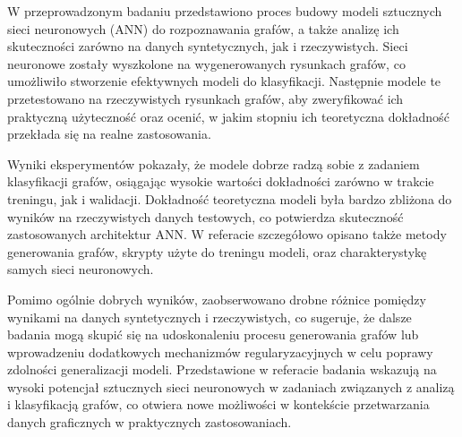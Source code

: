 
W przeprowadzonym badaniu przedstawiono proces budowy modeli sztucznych sieci neuronowych (ANN) do rozpoznawania grafów,
a także analizę ich skuteczności zarówno na danych syntetycznych, jak i rzeczywistych.
Sieci neuronowe zostały wyszkolone na wygenerowanych rysunkach grafów,
co umożliwiło stworzenie efektywnych modeli do klasyfikacji.
Następnie modele te przetestowano na rzeczywistych rysunkach grafów,
aby zweryfikować ich praktyczną użyteczność oraz ocenić,
w jakim stopniu ich teoretyczna dokładność przekłada się na realne zastosowania.

Wyniki eksperymentów pokazały, że modele dobrze radzą sobie z zadaniem klasyfikacji grafów,
osiągając wysokie wartości dokładności zarówno w trakcie treningu, jak i walidacji.
Dokładność teoretyczna modeli była bardzo zbliżona do wyników na rzeczywistych danych testowych,
co potwierdza skuteczność zastosowanych architektur ANN.
W referacie szczegółowo opisano także metody generowania grafów,
skrypty użyte do treningu modeli, oraz charakterystykę samych sieci neuronowych.

Pomimo ogólnie dobrych wyników,
zaobserwowano drobne różnice pomiędzy wynikami na danych syntetycznych i rzeczywistych,
co sugeruje, że dalsze badania mogą skupić się na udoskonaleniu procesu generowania grafów
lub wprowadzeniu dodatkowych mechanizmów regularyzacyjnych w celu poprawy zdolności generalizacji modeli.
Przedstawione w referacie badania wskazują na wysoki potencjał sztucznych sieci neuronowych
w zadaniach związanych z analizą i klasyfikacją grafów,
co otwiera nowe możliwości w kontekście przetwarzania danych graficznych w praktycznych zastosowaniach.